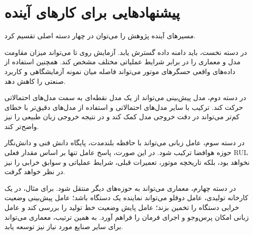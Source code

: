 \documentclass[a4paper,fleqn]{report}
\begin{document}


\section{پیشنهادهایی برای کارهای آینده}
\label{sec:future-work-final}

مسیرهای آینده پژوهش را می‌توان در چهار دسته اصلی تقسیم کرد.

در دسته نخست، باید دامنه داده گسترش یابد. آزمایش روی  تا  می‌تواند میزان مقاومت مدل و معماری را در برابر شرایط عملیاتی مختلف مشخص کند. همچنین استفاده از داده‌های واقعی حسگرهای موتور می‌تواند فاصله میان نمونه آزمایشگاهی و کاربرد صنعتی را کاهش دهد.

در دسته دوم، مدل پیش‌بینی می‌تواند از یک مدل نقطه‌ای به سمت مدل‌های احتمالاتی حرکت کند. ترکیب  با سایر مدل‌های احتمالاتی و استفاده از مدل‌های دقیق‌تر با خطای کم‌تر می‌تواند در دقت خروجی مدل کمک کند و در نتیجه خروجی زبان طبیعی را نیز واضح‌تر کند.

در دسته سوم، عامل زبانی می‌تواند با حافظه بلندمدت، پایگاه دانش فنی و دانش‌نگار حوزه هوافضا ترکیب شود. در این صورت، پاسخ عامل تنها بر اساس مقدار فعلی \gls{RUL} نخواهد بود، بلکه تاریخچه موتور، تعمیرات قبلی، شرایط عملیاتی و سوابق خرابی را نیز در نظر خواهد گرفت.

در دسته چهارم، معماری می‌تواند به حوزه‌های دیگر منتقل شود. برای مثال، در یک کارخانه تولیدی، عامل دوقلو می‌تواند نماینده یک دستگاه  باشد؛ عامل پیش‌بینی وضعیت خرابی دستگاه را تخمین بزند؛ عامل پایش وضعیت خط تولید را بررسی کند و عامل زبانی امکان پرس‌وجو و اجرای فرمان را فراهم آورد. به همین ترتیب، معماری می‌تواند برای سایر صنایع مورد نیاز نیز توسعه یابد.
\end{document}
